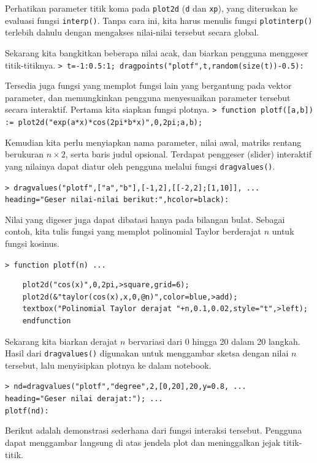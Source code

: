 \documentclass[11pt, a4paper]{article}
\newcommand{\emtcmd}[1]{\noindent\texttt{\textcolor{emtcommand}{>}\ #1}\par\smallskip}
\begin{document}
Perhatikan parameter titik koma pada \texttt{plot2d} (\texttt{d} dan \texttt{xp}), yang diteruskan ke evaluasi fungsi \texttt{interp()}. Tanpa cara ini, kita harus menulis fungsi \texttt{plotinterp()} terlebih dahulu dengan mengakses nilai-nilai tersebut secara global.

Sekarang kita bangkitkan beberapa nilai acak, dan biarkan pengguna menggeser titik-titiknya.
\emtcmd{t=-1:0.5:1; dragpoints("plotf",t,random(size(t))-0.5):}

Tersedia juga fungsi yang memplot fungsi lain yang bergantung pada vektor parameter, dan memungkinkan pengguna menyesuaikan parameter tersebut secara interaktif. Pertama kita siapkan fungsi plotnya.
\emtcmd{function plotf([a,b]) := plot2d("exp(a*x)*cos(2pi*b*x)",0,2pi;a,b);}

Kemudian kita perlu menyiapkan nama parameter, nilai awal, matriks rentang berukuran $n \times 2$, serta baris judul opsional. Terdapat penggeser (slider) interaktif yang nilainya dapat diatur oleh pengguna melalui fungsi \texttt{dragvalues()}.

\emtcmd{dragvalues("plotf",["a","b"],[-1,2],[[-2,2];[1,10]], ... \\
\hspace*{1em} heading="Geser nilai-nilai berikut:",hcolor=black):}

Nilai yang digeser juga dapat dibatasi hanya pada bilangan bulat. Sebagai contoh, kita tulis fungsi yang memplot polinomial Taylor berderajat $n$ untuk fungsi kosinus.

\emtcmd{function plotf(n) ...}
\begin{verbatim}
    plot2d("cos(x)",0,2pi,>square,grid=6);
    plot2d(&"taylor(cos(x),x,0,@n)",color=blue,>add);
    textbox("Polinomial Taylor derajat "+n,0.1,0.02,style="t",>left);
    endfunction
\end{verbatim}

Sekarang kita biarkan derajat $n$ bervariasi dari 0 hingga 20 dalam 20 langkah. Hasil dari \texttt{dragvalues()} digunakan untuk menggambar sketsa dengan nilai $n$ tersebut, lalu menyisipkan plotnya ke dalam notebook.

\emtcmd{nd=dragvalues("plotf","degree",2,[0,20],20,y=0.8, ... \\
\hspace*{1em} heading="Geser nilai derajat:"); ... \\
\hspace*{1em} plotf(nd):}

Berikut adalah demonstrasi sederhana dari fungsi interaksi tersebut. Pengguna dapat menggambar langsung di atas jendela plot dan meninggalkan jejak titik-titik.
\end{document}
